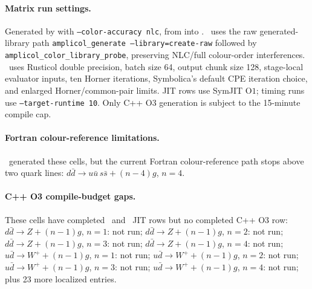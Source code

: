 \paragraph{Matrix run settings.}
\noindent\footnotesize Generated by  with \texttt{--color-accuracy nlc}, from  into . \AC\ uses the raw generated-library path \texttt{amplicol\_generate --library=create-raw} followed by \texttt{amplicol\_color\_library\_probe}, preserving NLC/full colour-order interferences. \PAC\ uses Rusticol double precision, batch size 64, output chunk size 128, stage-local evaluator inputs, ten Horner iterations, Symbolica's default CPE iteration choice, and enlarged Horner/common-pair limits.  JIT rows use SymJIT \(\mathrm{O}1\); timing runs use \texttt{--target-runtime 10}.  Only C++ O3 generation is subject to the 15-minute compile cap.
\par\smallskip
\paragraph{Fortran colour-reference limitations.}
\PAC\ generated these cells, but the current Fortran colour-reference path stops above two quark lines: $d\bar d\to u\bar{u}\,s\bar{s}+(n-4)g$, \(n=4\).
\par\smallskip
\paragraph{C++ O3 compile-budget gaps.}
These cells have completed \AC\ and \PAC\ JIT rows but no completed C++ O3 row: $d\bar d\to Z+(n-1)g$, \(n=1\): not run; $d\bar d\to Z+(n-1)g$, \(n=2\): not run; $d\bar d\to Z+(n-1)g$, \(n=3\): not run; $d\bar d\to Z+(n-1)g$, \(n=4\): not run; $u\bar d\to W^++(n-1)g$, \(n=1\): not run; $u\bar d\to W^++(n-1)g$, \(n=2\): not run; $u\bar d\to W^++(n-1)g$, \(n=3\): not run; $u\bar d\to W^++(n-1)g$, \(n=4\): not run; plus 23 more localized entries.
\par\smallskip